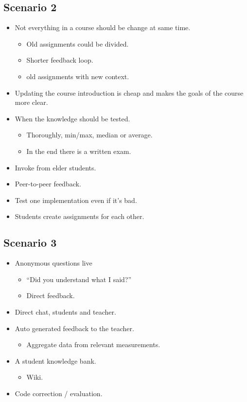 \subsection*{Scenario 2}
\begin{itemize}
\item Not everything in a course should be change at same time.
\begin{itemize}
\item Old assignments could be divided.
\item Shorter feedback loop.
\item old assignments with new context.
\end{itemize}
\item Updating the course introduction is cheap and makes the goals of the course more clear.
\item When the knowledge should be tested.
\begin{itemize}
\item Thoroughly, min/max, median or average.
\item In the end there is a written exam.
\end{itemize}
\item Invoke from elder students.
\item Peer-to-peer feedback.
\item Test one implementation even if it's bad.
\item Students create assignments for each other.
\end{itemize}

\subsection*{Scenario 3}
\begin{itemize}
\item Anonymous questions live
\begin{itemize}
\item ``Did you understand what I said?''
\item Direct feedback.
\end{itemize}
\item Direct chat, students and teacher.
\item Auto generated feedback to the teacher.
\begin{itemize}
\item Aggregate data from relevant measurements.
\end{itemize}
\item A student knowledge bank.
\begin{itemize}
\item Wiki.
\end{itemize}
\item Code correction / evaluation.
\end{itemize}
